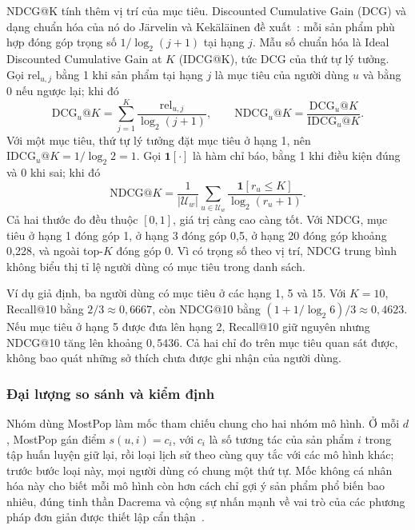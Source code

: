 NDCG@K tính thêm vị trí của mục tiêu. Discounted Cumulative Gain (DCG) và dạng chuẩn hóa của nó do Järvelin và Kekäläinen đề xuất~\cite{jarvelin2002cumulated}: mỗi sản phẩm phù hợp đóng góp trọng số $1/\log_2(j+1)$ tại hạng $j$. Mẫu số chuẩn hóa là Ideal Discounted Cumulative Gain at $K$ (IDCG@K), tức DCG của thứ tự lý tưởng. Gọi $\mathrm{rel}_{u,j}$ bằng 1 khi sản phẩm tại hạng $j$ là mục tiêu của người dùng $u$ và bằng 0 nếu ngược lại; khi đó
\begin{equation}
\mathrm{DCG}_u@K=\sum_{j=1}^{K}
\frac{\mathrm{rel}_{u,j}}{\log_2(j+1)},\qquad
\mathrm{NDCG}_u@K=\frac{\mathrm{DCG}_u@K}{\mathrm{IDCG}_u@K}.
\label{eq:dcg-evaluation}
\end{equation}
Với một mục tiêu, thứ tự lý tưởng đặt mục tiêu ở hạng 1, nên $\mathrm{IDCG}_u@K=1/\log_2 2=1$. Gọi $\mathbf{1}[\cdot]$ là hàm chỉ báo, bằng 1 khi điều kiện đúng và 0 khi sai; khi đó
\begin{equation}
\mathrm{NDCG@}K=\frac{1}{|\mathcal{U}_w|}
\sum_{u\in\mathcal{U}_w}\frac{\mathbf{1}[r_u\le K]}{\log_2(r_u+1)}.
\label{eq:ndcg-evaluation}
\end{equation}
Cả hai thước đo đều thuộc $[0,1]$, giá trị càng cao càng tốt. Với NDCG, mục tiêu ở hạng 1 đóng góp 1, ở hạng 3 đóng góp 0,5, ở hạng 20 đóng góp khoảng 0,228, và ngoài top-$K$ đóng góp 0. Vì có trọng số theo vị trí, NDCG trung bình không biểu thị tỉ lệ người dùng có mục tiêu trong danh sách.

Ví dụ giả định, ba người dùng có mục tiêu ở các hạng 1, 5 và 15. Với $K=10$, Recall@10 bằng $2/3\approx0{,}6667$, còn NDCG@10 bằng $(1+1/\log_2 6)/3\approx0{,}4623$. Nếu mục tiêu ở hạng 5 được đưa lên hạng 2, Recall@10 giữ nguyên nhưng NDCG@10 tăng lên khoảng $0{,}5436$. Cả hai chỉ đo trên mục tiêu quan sát được, không bao quát những sở thích chưa được ghi nhận của người dùng.

\subsubsection{Đại lượng so sánh và kiểm định}
\label{sec:comparison-interpretation}

\label{sec:mostpop}
Nhóm dùng MostPop làm mốc tham chiếu chung cho hai nhóm mô hình. Ở mỗi $d$, MostPop gán điểm $s(u,i)=c_i$, với $c_i$ là số tương tác của sản phẩm $i$ trong tập huấn luyện giữ lại, rồi loại lịch sử theo cùng quy tắc với các mô hình khác; trước bước loại này, mọi người dùng có chung một thứ tự. Mốc không cá nhân hóa này cho biết mỗi mô hình còn hơn cách chỉ gợi ý sản phẩm phổ biến bao nhiêu, đúng tinh thần Dacrema và cộng sự nhấn mạnh về vai trò của các phương pháp đơn giản được thiết lập cẩn thận~\cite{dacrema2019progress}.

